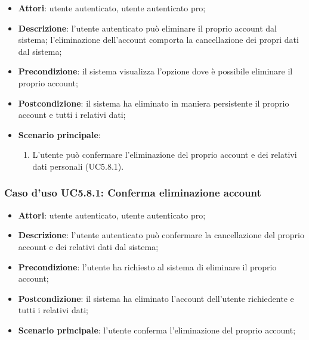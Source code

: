 \begin{itemize}
	\item \textbf{Attori}: utente autenticato, utente autenticato pro;
	\item \textbf{Descrizione}: l'utente autenticato può eliminare il proprio account dal sistema; l'eliminazione dell'account comporta la cancellazione dei propri dati dal sistema; 
	\item \textbf{Precondizione}: il sistema visualizza l'opzione dove è possibile eliminare il proprio account;
	\item \textbf{Postcondizione}: il sistema ha eliminato in maniera persistente il proprio account e tutti i relativi dati;
	\item \textbf{Scenario principale}:
		\begin{enumerate}
			\item L'utente può confermare l'eliminazione del proprio account e dei relativi dati personali (UC5.8.1).
		\end{enumerate}
\end{itemize}

\subsubsection{Caso d'uso UC5.8.1: Conferma eliminazione account}

\begin{itemize}
	\item \textbf{Attori}: utente autenticato, utente autenticato pro;
	\item \textbf{Descrizione}: l'utente autenticato può confermare la cancellazione del proprio account e dei relativi dati dal sistema;
	\item \textbf{Precondizione}: l'utente ha richiesto al sistema di eliminare il proprio account;
	\item \textbf{Postcondizione}: il sistema ha eliminato l'account dell'utente richiedente e tutti i relativi dati;
	\item \textbf{Scenario principale}: l'utente conferma l'eliminazione del proprio account;
\end{itemize}